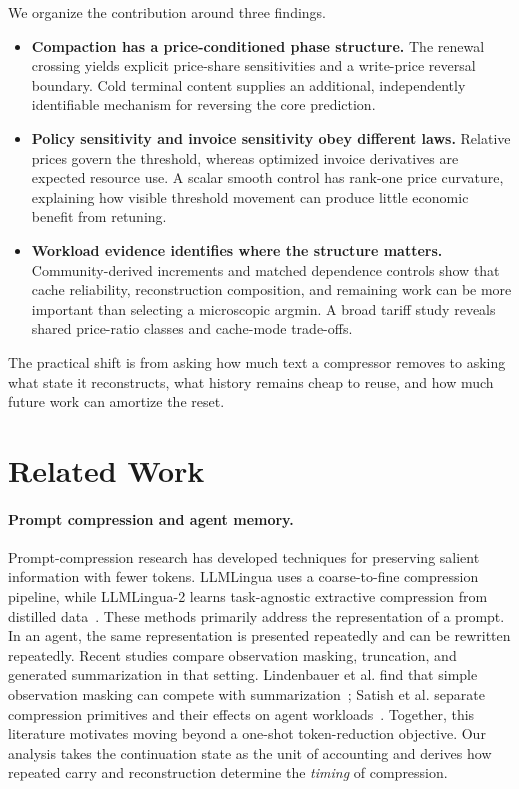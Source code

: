 \documentclass[sigconf,screen,nonacm]{acmart}
\begin{document}
We organize the contribution around three findings.
\begin{itemize}
\item \textbf{Compaction has a price-conditioned phase structure.} The renewal
  crossing yields explicit price-share sensitivities and a write-price reversal
  boundary. Cold terminal content supplies an additional, independently
  identifiable mechanism for reversing the core prediction.
\item \textbf{Policy sensitivity and invoice sensitivity obey different laws.}
  Relative prices govern the threshold, whereas optimized invoice derivatives
  are expected resource use. A scalar smooth control has rank-one price
  curvature, explaining how visible threshold movement can produce little
  economic benefit from retuning.
\item \textbf{Workload evidence identifies where the structure matters.}
  Community-derived increments and matched dependence controls show that
  cache reliability, reconstruction composition, and remaining work can be
  more important than selecting a microscopic argmin. A broad tariff study
  reveals shared price-ratio classes and cache-mode trade-offs.
\end{itemize}

The practical shift is from asking how much text a compressor removes to
asking what state it reconstructs, what history remains cheap to reuse, and
how much future work can amortize the reset.

\section{Related Work}
\label{sec:related}

\paragraph{Prompt compression and agent memory.}
Prompt-compression research has developed techniques for preserving salient
information with fewer tokens. LLMLingua uses a coarse-to-fine compression
pipeline, while LLMLingua-2 learns task-agnostic extractive compression from
distilled data~\cite{llmlingua,llmlingua2}. These methods primarily address
the representation of a prompt. In an agent, the same representation is
presented repeatedly and can be rewritten repeatedly. Recent studies compare
observation masking, truncation, and generated summarization in that setting.
Lindenbauer et al. find that simple observation masking can compete with
summarization~\cite{complexity}; Satish et al. separate compression primitives
and their effects on agent workloads~\cite{beyond}. Together, this literature
motivates moving beyond a one-shot token-reduction objective. Our analysis
takes the continuation state as the unit of accounting and derives how
repeated carry and reconstruction determine the \emph{timing} of compression.
\end{document}
